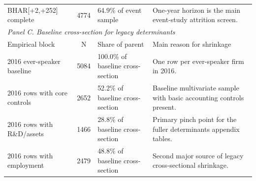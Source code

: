 \begin{table}[!htbp]
\begin{tabular}{p{4.0cm}cp{2.8cm}p{7.0cm}}
BHAR[+2,+252] complete & 4774 & 64.9\% of event sample & One-year horizon is the main event-study attrition screen. \\
\multicolumn{4}{l}{\textit{Panel C. Baseline cross-section for legacy determinants}} \\
Empirical block & N & Share of parent & Main reason for shrinkage \\
2016 ever-speaker baseline & 5084 & 100.0\% of baseline cross-section & One row per ever-speaker firm in 2016. \\
2016 rows with core controls & 2652 & 52.2\% of baseline cross-section & Baseline multivariate sample with basic accounting controls present. \\
2016 rows with R\&D/assets & 1466 & 28.8\% of baseline cross-section & Primary pinch point for the fuller determinants appendix tables. \\
2016 rows with employment & 2479 & 48.8\% of baseline cross-section & Second major source of legacy cross-sectional shrinkage. \\
\hline
\end{tabular}
\end{table}
